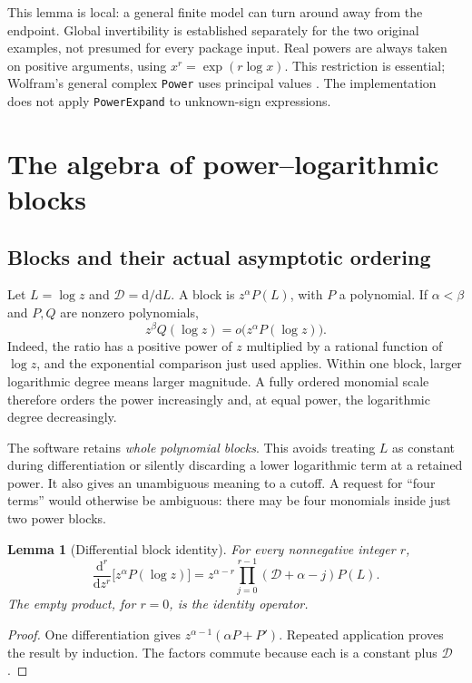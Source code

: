 \documentclass[11pt,a4paper]{article}
\numberwithin{equation}{section}
\newtheorem{lemma}[theorem]{Lemma}
\theoremstyle{definition}
\theoremstyle{remark}
\newcommand{\dd}{\mathrm d}
\newcommand{\D}{\mathcal D}
\begin{document}
This lemma is local: a general finite model can turn around away from the
endpoint. Global invertibility is established separately for the two
original examples, not presumed for every package input. Real powers are
always taken on positive arguments, using $x^r=\exp(r\log x)$.
This restriction is essential; Wolfram's general complex \texttt{Power}
uses principal values \cite{wlpower}. The implementation does not apply
\texttt{PowerExpand} to unknown-sign expressions.

\section{The algebra of power--logarithmic blocks}
\label{sec:algebra}

\subsection{Blocks and their actual asymptotic ordering}

Let $L=\log z$ and $\D=\dd/\dd L$. A block is $z^\alpha P(L)$, with
$P$ a polynomial. If $\alpha<\beta$ and $P,Q$ are nonzero polynomials,
\begin{equation}
 z^\beta Q(\log z)=o\bigl(z^\alpha P(\log z)\bigr).
 \label{eq:dominance}
\end{equation}
Indeed, the ratio has a positive power of $z$ multiplied by a rational
function of $\log z$, and the exponential comparison just used applies.
Within one block, larger logarithmic degree means larger magnitude.
A fully ordered monomial scale therefore orders the power increasingly and,
at equal power, the logarithmic degree decreasingly.

The software retains \emph{whole polynomial blocks}. This avoids treating
$L$ as constant during differentiation or silently discarding a lower
logarithmic term at a retained power. It also gives an unambiguous meaning
to a cutoff. A request for ``four terms'' would otherwise be ambiguous:
there may be four monomials inside just two power blocks.

\begin{lemma}[Differential block identity]
For every nonnegative integer $r$,
\begin{equation}
 \frac{\dd^r}{\dd z^r}\bigl[z^\alpha P(\log z)\bigr]
 =z^{\alpha-r}\prod_{j=0}^{r-1}(\D+\alpha-j)P(L).
 \label{eq:block-derivative}
\end{equation}
The empty product, for $r=0$, is the identity operator.
\end{lemma}
\begin{proof}
One differentiation gives
$z^{\alpha-1}(\alpha P+P')$. Repeated application proves the result by
induction. The factors commute because each is a constant plus $\D$.
\end{proof}
\end{document}
